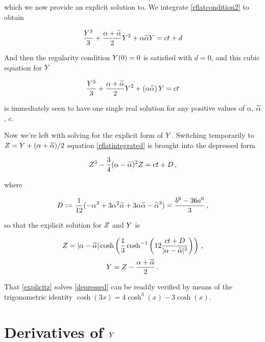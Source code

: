 which we now provide an explicit solution to. We integrate \eqref{rflatcondition2} to obtain

\begin{equation}
	\frac{Y^3}{3} + \frac{\alpha + \widetilde{\alpha}}{2} Y^2 + \alpha \widetilde{\alpha} Y = ct + d \label{rflatintegrated}
\end{equation}

And then the regularity condition $Y(0)=0$ is satisfied with $d=0$, and this cubic equation for $Y$

\begin{equation}
	\frac{Y^3}{3} + \frac{\alpha + \widetilde{\alpha}}{2} Y^2 + (\alpha \widetilde{\alpha})\, Y = ct
\end{equation}

is immediately seen to have one single real solution for any positive values of $\alpha$, $\widetilde{\alpha}$, $c$.

Now we're left with solving for the explicit form of $Y$. Switching temporarily to $Z = Y + (\alpha + \widetilde{\alpha})/2$ equation \eqref{rflatintegrated} is brought into the depressed form

\begin{equation}
	Z^3 - \frac{3}4 (\alpha - \widetilde{\alpha})^2 Z = ct + D\,,
	\label{depressed}
\end{equation}

where

\begin{equation}
	D := \frac{1}{12}(-\alpha^3 + 3 \alpha^2 \widetilde{\alpha} + 3 \alpha\widetilde{\alpha} - \widetilde{\alpha}^3) = \frac{b^6-36a^6}{3}\,,
	\label{dprime}
\end{equation}

so that the explicit solution for $Z$ and $Y$ is

\begin{equation}
	Z = |\alpha - \widetilde{\alpha}| \cosh \left( \frac{1}{3} \cosh^{-1} \left( 12 \frac{ct + D}{|\alpha-\widetilde{\alpha}|^3} \right) \right)  \,,
	\label{explicitz}
\end{equation}
\begin{equation}
	Y = Z - \frac{\alpha + \widetilde{\alpha}}2 \,.
	\label{explicitY}
\end{equation}

That \eqref{explicitz} solves \eqref{depressed} can be readily verified by means of the trigonometric identity $\cosh(3x) = 4 \cosh^3(x) - 3 \cosh(x)$.



\section{Derivatives of $Y$}\label{sec:yderivatives}
\newcommand{\conethird}{\ensuremath{C_{1/3}}}
\newcommand{\CF}{\ensuremath{\conethird(T)}}
\newcommand{\CFp}{\ensuremath{\conethird^{\,\prime}(T)}}
\newcommand{\CFpp}{\ensuremath{\conethird^{\,\prime\prime}(T)}}


